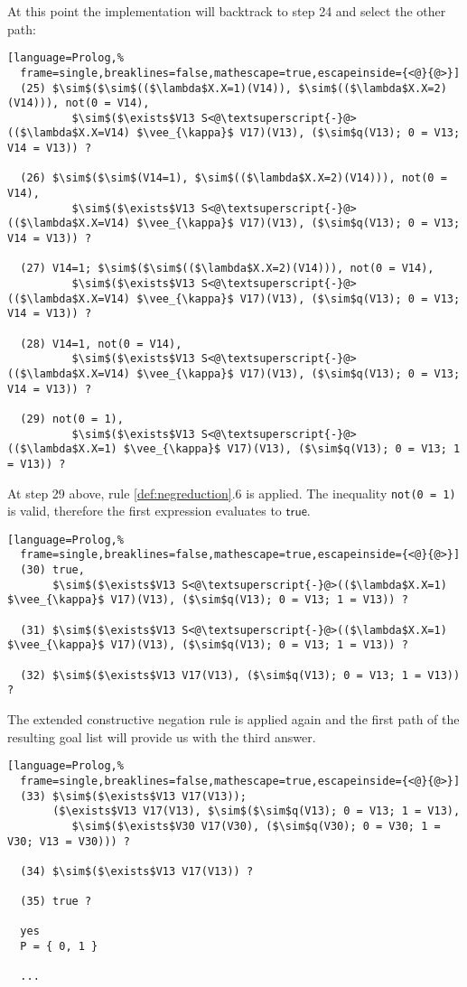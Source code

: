 \documentclass[inscr,ack,preface]{dithesis}
\theoremstyle{definition}
\newcommand{\msf}[1]{$\mathsf{#1}$}
\begin{document}
At this point the implementation will backtrack to step 24 and select the other path:
\begin{lstlisting}[language=Prolog,%
  frame=single,breaklines=false,mathescape=true,escapeinside={<@}{@>}]
  (25) $\sim$($\sim$(($\lambda$X.X=1)(V14)), $\sim$(($\lambda$X.X=2)(V14))), not(0 = V14),
          $\sim$($\exists$V13 S<@\textsuperscript{-}@>(($\lambda$X.X=V14) $\vee_{\kappa}$ V17)(V13), ($\sim$q(V13); 0 = V13; V14 = V13)) ?

  (26) $\sim$($\sim$(V14=1), $\sim$(($\lambda$X.X=2)(V14))), not(0 = V14),
          $\sim$($\exists$V13 S<@\textsuperscript{-}@>(($\lambda$X.X=V14) $\vee_{\kappa}$ V17)(V13), ($\sim$q(V13); 0 = V13; V14 = V13)) ?

  (27) V14=1; $\sim$($\sim$(($\lambda$X.X=2)(V14))), not(0 = V14),
          $\sim$($\exists$V13 S<@\textsuperscript{-}@>(($\lambda$X.X=V14) $\vee_{\kappa}$ V17)(V13), ($\sim$q(V13); 0 = V13; V14 = V13)) ?

  (28) V14=1, not(0 = V14),
          $\sim$($\exists$V13 S<@\textsuperscript{-}@>(($\lambda$X.X=V14) $\vee_{\kappa}$ V17)(V13), ($\sim$q(V13); 0 = V13; V14 = V13)) ?

  (29) not(0 = 1),
          $\sim$($\exists$V13 S<@\textsuperscript{-}@>(($\lambda$X.X=1) $\vee_{\kappa}$ V17)(V13), ($\sim$q(V13); 0 = V13; 1 = V13)) ?
\end{lstlisting}

At step 29 above, rule \ref{def:negreduction}.6 is applied. The inequality \texttt{not(0 = 1)} is valid, therefore the first expression evaluates to \msf{true}.
\begin{lstlisting}[language=Prolog,%
  frame=single,breaklines=false,mathescape=true,escapeinside={<@}{@>}]
  (30) true,
       $\sim$($\exists$V13 S<@\textsuperscript{-}@>(($\lambda$X.X=1) $\vee_{\kappa}$ V17)(V13), ($\sim$q(V13); 0 = V13; 1 = V13)) ?

  (31) $\sim$($\exists$V13 S<@\textsuperscript{-}@>(($\lambda$X.X=1) $\vee_{\kappa}$ V17)(V13), ($\sim$q(V13); 0 = V13; 1 = V13)) ?

  (32) $\sim$($\exists$V13 V17(V13), ($\sim$q(V13); 0 = V13; 1 = V13)) ?
\end{lstlisting}

The extended constructive negation rule is applied again and the first path of the resulting goal list will provide us with the third answer.
\begin{lstlisting}[language=Prolog,%
  frame=single,breaklines=false,mathescape=true,escapeinside={<@}{@>}]
  (33) $\sim$($\exists$V13 V17(V13));
       ($\exists$V13 V17(V13), $\sim$($\sim$q(V13); 0 = V13; 1 = V13),
          $\sim$($\exists$V30 V17(V30), ($\sim$q(V30); 0 = V30; 1 = V30; V13 = V30))) ?

  (34) $\sim$($\exists$V13 V17(V13)) ?

  (35) true ?

  yes
  P = { 0, 1 }

  ...
\end{lstlisting}
\end{document}
